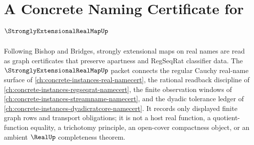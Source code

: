 \chapter{A Concrete Naming Certificate for $\StronglyExtensionalRealMapUp$}
\label{ch:concrete-instances-strongly-extensional-real-map-namecert}

Following Bishop and Bridges, strongly extensional maps on real names are read as graph certificates that preserve apartness and RegSeqRat classifier data. The $\StronglyExtensionalRealMapUp$ packet connects the regular Cauchy real-name surface of \autoref{ch:concrete-instances-real-namecert}, the rational readback discipline of \autoref{ch:concrete-instances-regseqrat-namecert}, the finite observation windows of \autoref{ch:concrete-instances-streamname-namecert}, and the dyadic tolerance ledger of \autoref{ch:concrete-instances-dyadicratcore-namecert}. It records only displayed finite graph rows and transport obligations; it is not a host real function, a quotient-function equality, a trichotomy principle, an open-cover compactness object, or an ambient $\RealUp$ completeness theorem.

